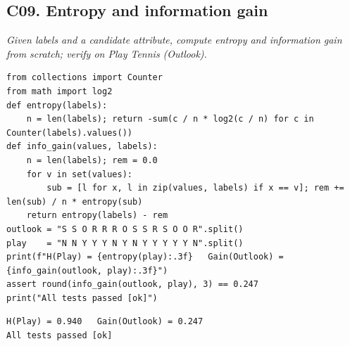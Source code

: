 \documentclass[11pt]{article}
\begin{document}
\subsection*{C09. Entropy and information gain \hfill{}}
\textit{Given labels and a candidate attribute, compute entropy and information gain from scratch; verify on Play Tennis (Outlook).}
\begin{lstlisting}[style=py]
from collections import Counter
from math import log2
def entropy(labels):
    n = len(labels); return -sum(c / n * log2(c / n) for c in Counter(labels).values())
def info_gain(values, labels):
    n = len(labels); rem = 0.0
    for v in set(values):
        sub = [l for x, l in zip(values, labels) if x == v]; rem += len(sub) / n * entropy(sub)
    return entropy(labels) - rem
outlook = "S S O R R R O S S R S O O R".split()
play    = "N N Y Y Y N Y N Y Y Y Y Y N".split()
print(f"H(Play) = {entropy(play):.3f}   Gain(Outlook) = {info_gain(outlook, play):.3f}")
assert round(info_gain(outlook, play), 3) == 0.247
print("All tests passed [ok]")
\end{lstlisting}
\begin{lstlisting}[style=out]
H(Play) = 0.940   Gain(Outlook) = 0.247
All tests passed [ok]
\end{lstlisting}
\end{document}
